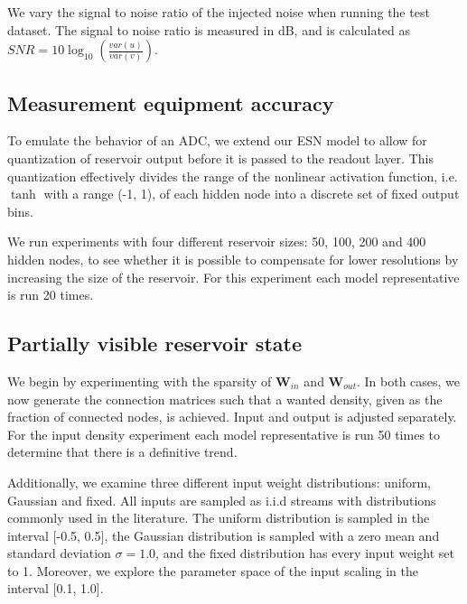 We vary the signal to noise ratio of the injected noise when running the test
dataset. The signal to noise ratio is measured in dB, and is calculated as $SNR
= 10\log_{10}(\frac{var(u)}{var(v)})$.

\subsection{Measurement equipment accuracy}

To emulate the behavior of an ADC, we extend our ESN model to allow for
quantization of reservoir output before it is passed to the readout layer. This
quantization effectively divides the range of the nonlinear activation function,
i.e. $\tanh$ with a range (-1, 1), of each hidden node into a discrete set of
fixed output bins.

We run experiments with four different reservoir sizes: 50, 100, 200 and 400
hidden nodes, to see whether it is possible to compensate for lower resolutions
by increasing the size of the reservoir. For this experiment each model
representative is run 20 times.

\subsection{Partially visible reservoir state}

We begin by experimenting with the sparsity of $\mathbf{W}_{in}$ and
$\mathbf{W}_{out}$. In both cases, we now generate the connection matrices such
that a wanted density, given as the fraction of connected nodes, is
achieved. Input and output is adjusted separately. For the input density
experiment each model representative is run 50 times to determine that there is
a definitive trend.

Additionally, we examine three different input weight distributions: uniform,
Gaussian and fixed. All inputs are sampled as i.i.d streams with distributions
commonly used in the literature. The uniform distribution is sampled in the
interval [-0.5, 0.5], the Gaussian distribution is sampled with a zero mean and
standard deviation $\sigma = 1.0$, and the fixed distribution has every input
weight set to 1. Moreover, we explore the parameter space of the input scaling
in the interval [0.1, 1.0].

